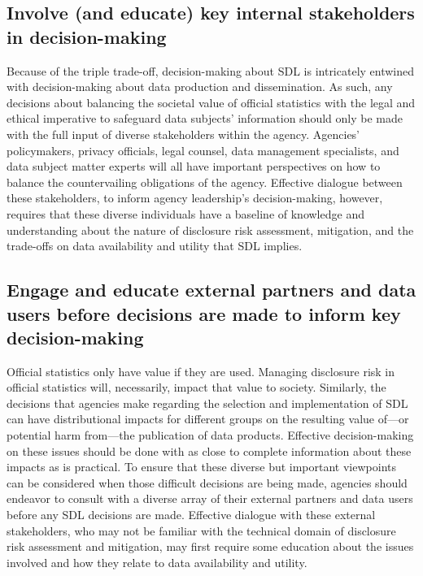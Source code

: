 \subsection{Involve (and educate) key internal stakeholders in decision-making}
Because of the triple trade-off, decision-making about SDL is intricately entwined with decision-making about data production and dissemination. As such, any decisions about balancing the societal value of official statistics with the legal and ethical imperative to safeguard data subjects' information should only be made with the full input of diverse stakeholders within the agency. Agencies' policymakers, privacy officials, legal counsel, data management specialists, and data subject matter experts will all have important perspectives on how to balance the countervailing obligations of the agency. Effective dialogue between these stakeholders, to inform agency leadership's decision-making, however, requires that these diverse individuals have a baseline of knowledge and understanding about the nature of disclosure risk assessment, mitigation, and the trade-offs on data availability and utility that SDL implies. 

\subsection{Engage and educate external partners and data users before decisions are made to inform key decision-making}
Official statistics only have value if they are used. Managing disclosure risk in official statistics will, necessarily, impact that value to society. Similarly, the decisions that agencies make regarding the selection and implementation of SDL can have distributional impacts for different groups on the resulting value of---or potential harm from---the publication of data products. Effective decision-making on these issues should be done with as close to complete information about these impacts as is practical. To ensure that these diverse but important viewpoints can be considered when those difficult decisions are being made, agencies should endeavor to consult with a diverse array of their external partners and data users before any SDL decisions are made. Effective dialogue with these external stakeholders, who may not be familiar with the technical domain of disclosure risk assessment and mitigation, may first require some education about the issues involved and how they relate to data availability and utility.

